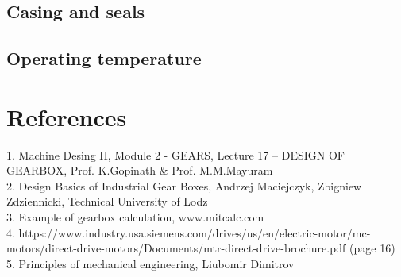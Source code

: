 \documentclass{article}
\begin{document}
\subsection{Casing and seals}
\subsection{Operating temperature}

\section{References}
1. Machine Desing II, Module 2 - GEARS, Lecture 17 – DESIGN OF GEARBOX, Prof. K.Gopinath \& Prof. M.M.Mayuram \\
2. Design Basics of Industrial Gear Boxes, Andrzej Maciejczyk, Zbigniew Zdziennicki, Technical University of Lodz \\
3. Example of gearbox calculation, www.mitcalc.com \\
4. https://www.industry.usa.siemens.com/drives/us/en/electric-motor/mc-motors/direct-drive-motors/Documents/mtr-direct-drive-brochure.pdf  (page 16) \\
5. Principles of mechanical engineering, Liubomir Dimitrov

\tableofcontents
\end{document}

